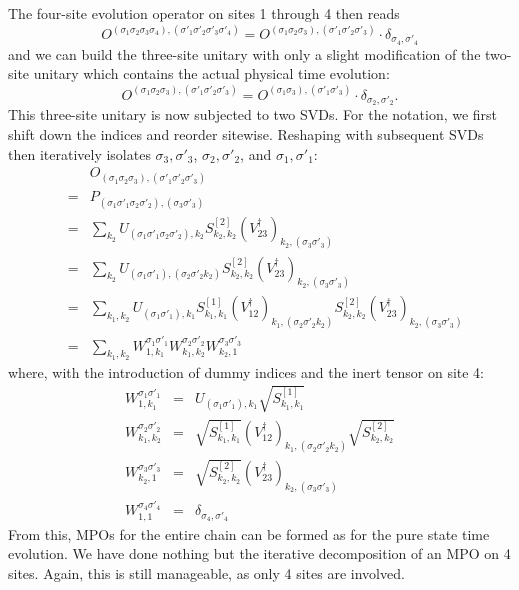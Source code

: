 \documentclass[a4paper,10pt,oneside,onecolumn,1p,times]{elsarticle}
\begin{document}
The four-site evolution operator on sites 1 through 4 then reads
\begin{equation}
O^{(\sigma_1\sigma_2\sigma_3\sigma_4), (\sigma'_1\sigma'_2\sigma'_3\sigma'_4)} =
O^{(\sigma_1\sigma_2\sigma_3), (\sigma'_1\sigma'_2\sigma'_3)}\cdot \delta_{\sigma_4,\sigma'_4}
\end{equation}
and we can build the three-site unitary with only a slight modification of the two-site unitary which contains the actual physical time evolution:
\begin{equation}
O^{(\sigma_1\sigma_2\sigma_3), (\sigma'_1\sigma'_2\sigma'_3)} = O^{(\sigma_1\sigma_3), (\sigma'_1\sigma'_3)} \cdot \delta_{\sigma_2,\sigma'_2} .
\end{equation}
This three-site unitary is now subjected to two SVDs. For the notation, we first shift down the indices and reorder sitewise. Reshaping with subsequent SVDs then iteratively isolates $\sigma_3,\sigma'_3$, $\sigma_2,\sigma'_2$, and $\sigma_1,\sigma'_1$: 
\begin{eqnarray*}
& & O_{(\sigma_1\sigma_2\sigma_3), (\sigma'_1\sigma'_2\sigma'_3)} \\
&=& P_{(\sigma_1 \sigma'_1\sigma_2\sigma'_2),(\sigma_3\sigma'_3)} \\
&=& \sum_{k_2} U_{(\sigma_1 \sigma'_1\sigma_2\sigma'_2),k_2} S^{[2]}_{k_2,k_2} (V^\dagger_{23})_{k_2,(\sigma_3\sigma'_3)} \\
&=&  \sum_{k_2} U_{(\sigma_1 \sigma'_1),(\sigma_2\sigma'_2 k_2)} S^{[2]}_{k_2,k_2} (V^\dagger_{23})_{k_2,(\sigma_3\sigma'_3)} \\
&=& \sum_{k_1,k_2} U_{(\sigma_1 \sigma'_1),k_1} S^{[1]}_{k_1,k_1} (V^\dagger_{12})_{k_1, (\sigma_2\sigma'_2 k_2)} S^{[2]}_{k_2,k_2} (V^\dagger_{23})_{k_2,(\sigma_3\sigma'_3)} \\
&=& \sum_{k_1,k_2} W^{\sigma_1 \sigma'_1}_{1,k_1} W^{\sigma_2 \sigma'_2}_{k_1,k_2} W^{\sigma_3 \sigma'_3}_{k_2,1} 
\end{eqnarray*}
where, with the introduction of dummy indices and the inert tensor on site 4:
\begin{eqnarray}
W^{\sigma_1 \sigma'_1}_{1,k_1} &=& U_{(\sigma_1 \sigma'_1),k_1} \sqrt{S^{[1]}_{k_1,k_1}} \\
W^{\sigma_2 \sigma'_2}_{k_1,k_2} &=& \sqrt{S^{[1]}_{k_1,k_1}} (V^\dagger_{12})_{k_1, (\sigma_2\sigma'_2 k_2)} \sqrt{S^{[2]}_{k_2,k_2}} \\
W^{\sigma_3 \sigma'_3}_{k_2,1} &=& \sqrt{S^{[2]}_{k_2,k_2}} (V^\dagger_{23})_{k_2,(\sigma_3\sigma'_3)} \\
W^{\sigma_4 \sigma'_4}_{1,1} &=& \delta_{\sigma_4,\sigma'_4}
\end{eqnarray}
From this, MPOs for the entire chain can be formed as for the pure state time evolution. We have done nothing but the iterative decomposition of an MPO on 4 sites. Again, this is still manageable, as only 4 sites are involved. 
\end{document}
